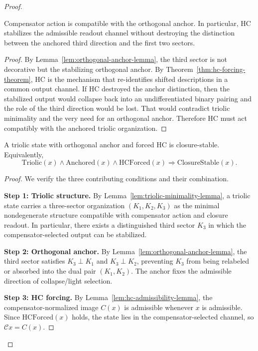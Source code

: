 \begin{proof}
\begin{lemma}
\label{lem:anchor-compatibility-lemma}
Compensator action is compatible with the orthogonal anchor. In particular, HC
stabilizes the admissible readout channel without destroying the distinction
between the anchored third direction and the first two sectors.
\end{lemma}

\begin{proof}
By Lemma~\ref{lem:orthogonal-anchor-lemma}, the third sector is not decorative
but the stabilizing orthogonal anchor. By Theorem~\ref{thm:hc-forcing-theorem},
HC is the mechanism that re-identifies shifted descriptions in a common output
channel. If HC destroyed the anchor distinction, then the stabilized output
would collapse back into an undifferentiated binary pairing and the role of the
third direction would be lost. That would contradict triolic minimality and the
very need for an orthogonal anchor. Therefore HC must act compatibly with the
anchored triolic organization.
\end{proof}

\begin{lemma}
\label{lem:closure-forcing-lemma}
A triolic state with orthogonal anchor and forced HC is closure-stable.
Equivalently,
\[
\mathrm{Triolic}(x)\wedge \mathrm{Anchored}(x)\wedge \mathrm{HCForced}(x)
\Longrightarrow \mathrm{ClosureStable}(x).
\]
\end{lemma}

\begin{proof}
We verify the three contributing conditions and their combination.

\smallskip
\noindent\textbf{Step 1: Triolic structure.}
By Lemma~\ref{lem:triolic-minimality-lemma}, a triolic state carries a
three-sector organization $(K_1,K_2,K_3)$ as the minimal nondegenerate
structure compatible with compensator action and closure readout.
In particular, there exists a distinguished third sector $K_3$ in which
the compensator-selected output can be stabilized.

\smallskip
\noindent\textbf{Step 2: Orthogonal anchor.}
By Lemma~\ref{lem:orthogonal-anchor-lemma}, the third sector satisfies
$K_3\perp K_1$ and $K_3\perp K_2$, preventing $K_3$ from being
relabeled or absorbed into the dual pair $(K_1,K_2)$.
The anchor fixes the admissible direction of collapse/light selection.

\smallskip
\noindent\textbf{Step 3: HC forcing.}
By Lemma~\ref{lem:hc-admissibility-lemma}, the compensator-normalized
image $C(x)$ is admissible whenever $x$ is admissible. Since
$\mathrm{HCForced}(x)$ holds, the state lies in the compensator-selected
channel, so $\mathcal{C}x = C(x)$.


\end{proof}
\end{proof}
